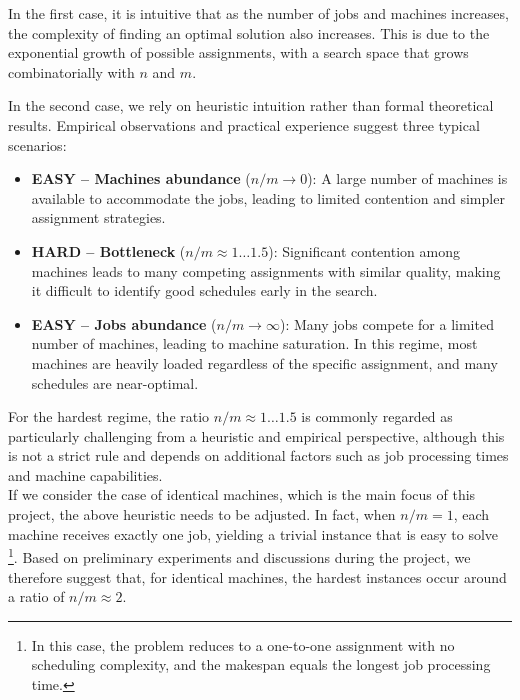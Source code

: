 In the first case, it is intuitive that as the number of jobs and machines increases, the complexity of finding an optimal solution also increases.
This is due to the exponential growth of possible assignments, with a search space that grows combinatorially with $n$ and $m$.

In the second case, we rely on heuristic intuition rather than formal theoretical results.
Empirical observations and practical experience suggest three typical scenarios:
\begin{itemize}
  \item \textbf{EASY -- Machines abundance} ($n/m \rightarrow 0$): A large number of machines is available to accommodate the jobs, leading to limited contention and simpler assignment strategies.

  \item \textbf{HARD -- Bottleneck} ($n/m \approx 1\dots 1.5$): Significant contention among machines leads to many competing assignments with similar quality, making it difficult to identify good schedules early in the search.

  \item \textbf{EASY -- Jobs abundance} ($n/m \rightarrow \infty$): Many jobs compete for a limited number of machines, leading to machine saturation.
  In this regime, most machines are heavily loaded regardless of the specific assignment, and many schedules are near-optimal.
\end{itemize}

For the hardest regime, the ratio $n/m \approx 1\dots 1.5$ is commonly regarded as particularly challenging from a heuristic and empirical perspective, although this is not a strict rule and depends on additional factors such as job processing times and machine capabilities.
\\
If we consider the case of identical machines, which is the main focus of this project, the above heuristic needs to be adjusted.
In fact, when $n/m = 1$, each machine receives exactly one job, yielding a trivial instance that is easy to solve%
\footnote{In this case, the problem reduces to a one-to-one assignment with no scheduling complexity, and the makespan equals the longest job processing time.}.
Based on preliminary experiments and discussions during the project, we therefore suggest that, for identical machines, the hardest instances occur around a ratio of $n/m \approx 2$.
